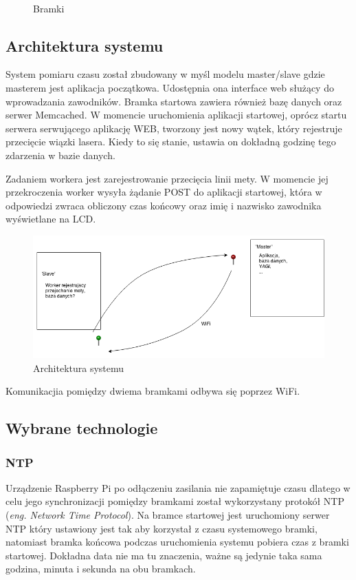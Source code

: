 \documentclass[11pt,a4paper, twoside]{article}
\begin{document}
\begin{figure}[H]
\begin{center}
\caption{Bramki}
$\label{both}$
\end{center}
\end{figure}

\newpage
\subsection{Architektura systemu}
System pomiaru czasu został zbudowany w myśl modelu master/slave gdzie masterem jest aplikacja początkowa. Udostępnia ona interface web służący do wprowadzania zawodników. Bramka startowa zawiera również bazę danych oraz serwer Memcached. W momencie uruchomienia aplikacji startowej, oprócz startu serwera serwującego aplikację WEB, tworzony jest nowy wątek, który rejestruje przecięcie wiązki lasera. Kiedy to się stanie, ustawia on dokładną godzinę tego zdarzenia w bazie danych.

Zadaniem workera jest zarejestrowanie przecięcia linii mety. W momencie jej przekroczenia worker wysyła żądanie POST do aplikacji startowej, która w odpowiedzi zwraca obliczony czas końcowy oraz imię i nazwisko zawodnika wyświetlane na LCD.
\newline

\begin{figure}[ht]
\includegraphics[scale=0.5]{./img/asdasd.png}
\caption{Architektura systemu}
\end{figure}
\noindent
Komunikacjia pomiędzy dwiema bramkami odbywa się poprzez WiFi.
\subsection{Wybrane technologie}
\subsubsection{NTP}
Urządzenie Raspberry Pi po odłączeniu zasilania nie zapamiętuje czasu dlatego w celu jego synchronizacji pomiędzy bramkami został wykorzystany protokół NTP (\emph{eng. Network Time Protocol}). Na bramce startowej jest uruchomiony serwer NTP który ustawiony jest tak aby korzystał z czasu systemowego bramki, natomiast bramka końcowa podczas uruchomienia systemu pobiera czas z bramki startowej. Dokładna data nie ma tu znaczenia, ważne są jedynie taka sama godzina, minuta i sekunda na obu bramkach.
\end{document}
